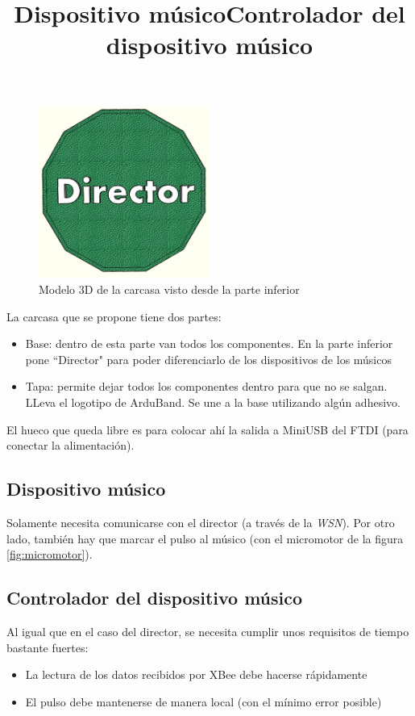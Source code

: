 \begin{figure}[!htb]
\centering
\includegraphics[width=0.5\textwidth]{./imagenes/carcasa_modelo_director_abajo}
\caption{Modelo 3D de la carcasa visto desde la parte inferior} \label{fig:carcasa_inferior}
\end{figure}

La carcasa que se propone tiene dos partes:
\begin{itemize}
  \item Base: dentro de esta parte van todos los componentes. En la parte inferior pone ``Director"
  para poder diferenciarlo de los dispositivos de los músicos
  \item Tapa: permite dejar todos los componentes dentro para que no se salgan. LLeva el logotipo
  de ArduBand. Se une a la base utilizando algún adhesivo.
\end{itemize}

El hueco que queda libre es para colocar ahí la salida a MiniUSB del FTDI (para conectar la alimentación).\\

\subsection{Dispositivo músico}
\title{Dispositivo músico}

Solamente necesita comunicarse con el director (a través de la \textit{WSN}). Por otro lado,
también hay que marcar el pulso al músico (con el micromotor de la figura \ref{fig:micromotor}).

\subsection{Controlador del dispositivo músico}
\title{Controlador del dispositivo músico}
Al igual que en el caso del director, se necesita cumplir unos requisitos de tiempo
bastante fuertes:
\begin{itemize}
  \item La lectura de los datos recibidos por XBee debe hacerse rápidamente
  \item El pulso debe mantenerse de manera local (con el mínimo error posible)
\end{itemize}

